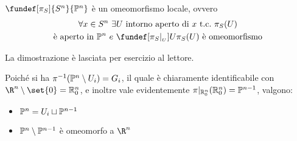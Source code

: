 \begin{prop}
	$\fundef[\pi_S]{S^n}{\Ps^n}$ è un omeomorfismo locale, ovvero
	\begin{gather*}
	\forall x \in S^n \ \exists U \text{ intorno aperto di } x \tc \pi_S(U) \\
	\text{è aperto in } \Ps^n \ e \ \fundef[\pi_S | _{_U}]{U}{\pi_S(U)} \text{ è omeomorfismo}
	\end{gather*}
\end{prop}
La dimostrazione è lasciata per esercizio al lettore.

Poiché si ha $\pi^{-1}(\mathbb{P}^n \setminus U_i) = G_i$, il quale è chiaramente identificabile con $\R^n \setminus \set{0} = \Ro$, e inoltre vale evidentemente $\pi | _{\mathbb{R}_0^{n}} (\mathbb{R}_0^{n}) = \mathbb{P}^{n-1}$, valgono:
\begin{itemize}
	\item $\mathbb{P}^n = U_i \sqcup \mathbb{P}^{n-1}$
	\item $\mathbb{P}^n \setminus \mathbb{P}^{n-1}$ è omeomorfo a $\R^n$
\end{itemize}


